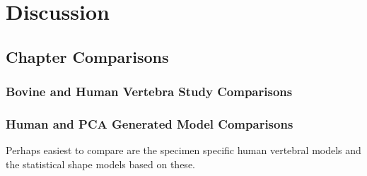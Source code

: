 \chapter{Discussion}

\section{Chapter Comparisons}

\subsection{Bovine and Human Vertebra Study Comparisons}

\subsection{Human and PCA Generated Model Comparisons}

Perhaps easiest to compare are the specimen specific human vertebral models and
the statistical shape models based on these.
